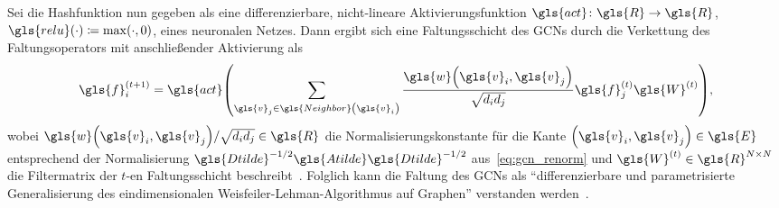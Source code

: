 Sei die Hashfunktion nun gegeben als eine differenzierbare, nicht-lineare Aktivierungsfunktion $\gls{act} \colon \gls{R} \to \gls{R}$, \bspw{} $\gls{relu}\left(\cdot\right) \coloneqq \max\left(\cdot, 0\right)$, eines neuronalen Netzes.
Dann ergibt sich eine Faltungsschicht des \glspl{GCN} durch die Verkettung des Faltungsoperators mit anschließender Aktivierung als
\begin{equation*}
  \gls{f}^{\left(t+1\right)}_i = \gls{act}\left(\sum_{\gls{v}_j \in \gls{Neighbor}\left(\gls{v}_i\right)} \frac{\gls{w}\left(\gls{v}_i, \gls{v}_j\right)}{\sqrt{d_i d_j}} \gls{f}^{\left(t\right)}_j \gls{W}^{\left(t\right)} \right),
\end{equation*}
wobei $\gls{w}\left(\gls{v}_i, \gls{v}_j\right)/\sqrt{d_i d_j} \in \gls{R}$ die Normalisierungskonstante für die Kante $\left(\gls{v}_i, \gls{v}_j\right) \in \gls{E}$ entsprechend der Normalisierung $\gls{Dtilde}^{-1/2}\gls{Atilde}\gls{Dtilde}^{-1/2}$ aus~\eqref{eq:gcn_renorm} und $\gls{W}^{\left(t\right)} \in \gls{R}^{N \times N}$ die Filtermatrix der $t$-en Faltungsschicht beschreibt~\cite{gcn}.
Folglich kann die Faltung des \glspl{GCN} als \enquote{differenzierbare und parametrisierte Generalisierung des eindimensionalen Weisfeiler-Lehman-Algorithmus auf Graphen} verstanden werden~\cite{gcn}.

